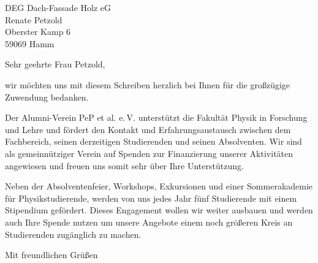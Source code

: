 \documentclass[
  pepbrief,
  fontsize=12pt,
  paper=a4,
  DIV=14,
  parskip=half,
  backaddress=false,
]{scrlttr2}
\author{Sascha Dungs}
\begin{document}
\begin{letter}{%
  DEG Dach-Fassade Holz eG\\
  Renate Petzold\\
  Oberster Kamp 6\\
  59069 Hamm%
}
\opening{Sehr geehrte Frau Petzold,}
wir möchten uns mit diesem Schreiben herzlich bei Ihnen für die großzügige Zuwendung bedanken.

Der Alumni-Verein PeP et al. e.\,V. unterstützt die Fakultät Physik in Forschung und Lehre und fördert den Kontakt und Erfahrungsaustausch zwischen dem Fachbereich,
seinen derzeitigen Studierenden und seinen Absolventen.
Wir sind als gemeinnütziger Verein auf Spenden zur Finanzierung unserer Aktivitäten angewiesen und freuen uns somit sehr über Ihre Unterstützung.

Neben der Absolventenfeier, Workshops, Exkursionen und einer Sommerakademie für Physikstudierende, werden von uns jedes Jahr fünf Studierende mit einem Stipendium gefördert.
Dieses Engagement wollen wir weiter ausbauen und werden auch Ihre Spende nutzen um unsere Angebote einem noch größeren Kreis an Studierenden zugänglich zu machen.

\closing{Mit freundlichen Grüßen}

\end{letter}
\end{document}
